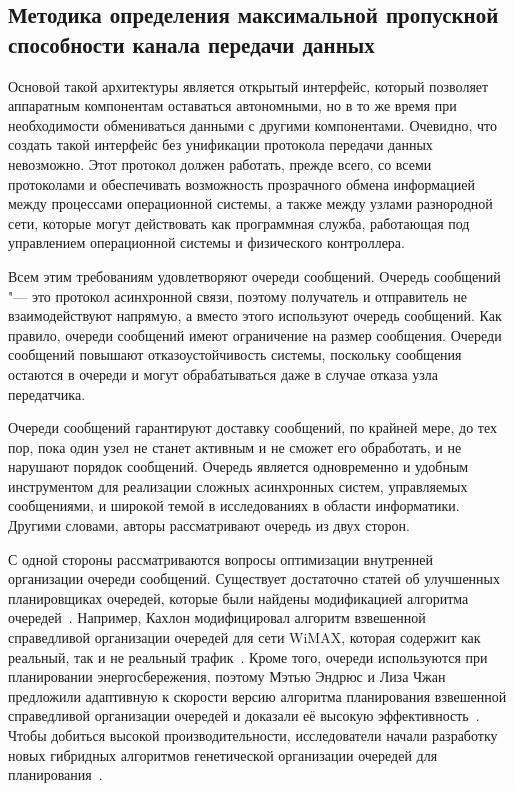 \subsection{Методика определения максимальной пропускной способности канала передачи данных}

Основой такой архитектуры является открытый интерфейс, который позволяет аппаратным компонентам оставаться автономными, но в то же время при необходимости обмениваться данными с другими компонентами. Очевидно, что создать такой интерфейс без унификации протокола передачи данных невозможно. Этот протокол должен работать, прежде всего, со всеми протоколами и обеспечивать возможность прозрачного обмена информацией между процессами операционной системы, а также между узлами разнородной сети, которые могут действовать как программная служба, работающая под управлением операционной системы и физического контроллера.

Всем этим требованиям удовлетворяют очереди сообщений. Очередь сообщений "--- это протокол асинхронной связи, поэтому получатель и отправитель не взаимодействуют напрямую, а вместо этого используют очередь сообщений. Как правило, очереди сообщений имеют ограничение на размер сообщения. Очереди сообщений повышают отказоустойчивость системы, поскольку сообщения остаются в очереди и могут обрабатываться даже в случае отказа узла передатчика.

Очереди сообщений гарантируют доставку сообщений, по крайней мере, до тех пор, пока один узел не станет активным и не сможет его обработать, и не нарушают порядок сообщений. Очередь является одновременно и удобным инструментом для реализации сложных асинхронных систем, управляемых сообщениями, и широкой темой в исследованиях в области информатики. Другими словами, авторы рассматривают очередь из двух сторон.

С одной стороны рассматриваются вопросы оптимизации внутренней организации очереди сообщений. Существует достаточно статей об улучшенных планировщиках очередей, которые были найдены модификацией алгоритма очередей~\cite{Valente201416, Rizzo201534}. Например, Кахлон модифицировал алгоритм взвешенной справедливой организации очередей для сети WiMAX, которая содержит как реальный, так и не реальный трафик~\cite{Kahlon2016357}. Кроме того, очереди используются при планировании энергосбережения, поэтому Мэтью Эндрюс и Лиза Чжан предложили адаптивную к скорости версию алгоритма планирования взвешенной справедливой организации очередей и доказали её высокую эффективность~\cite{Andrews2014247}. Чтобы добиться высокой производительности, исследователи начали разработку новых гибридных алгоритмов генетической организации очередей для планирования~\cite{Rashidi2017331, Kahlon2016357}.

